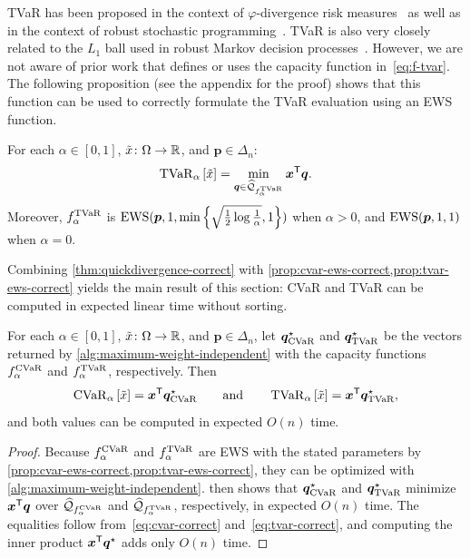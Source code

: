 TVaR has been proposed in the context of $\varphi$-divergence risk measures~\cite{Kruse2021} as well as in the context of robust stochastic programming~\cite{Shapiro2017}. TVaR is also very closely related to the $L_1$ ball used in robust Markov decision processes~\cite{Ho2021,Ho2022}. However, we are not aware of prior work that defines or uses the capacity function in~\eqref{eq:f-tvar}. The following proposition (see the appendix for the proof) shows that this function can be used to correctly formulate the TVaR evaluation using an EWS function. 
\begin{proposition} \label{prop:tvar-ews-correct}
For each $\alpha\in [0,1]$, $\tilde{x} \colon \Omega \to \mathbb{R}$, and $\bm{p} \in \Delta_n$: 
\begin{equation} \label{eq:tvar-correct}
  \operatorname{TVaR}_{\alpha} \left[\tilde{x} \right] = \min_{\bm{q}\in \widehat{\mathcal{Q}}_{f_{\alpha}^{\operatorname{TVaR}}}} \bm{x}^{\mathsf{T}} \bm{q}.
\end{equation}
Moreover, $f^{\operatorname{TVaR}}_{\alpha }$ is $\operatorname{EWS}(\bm{p}, 1, \min \left\{   \sqrt{\frac{1}{2}  \log \frac{1}{\alpha}}, 1 \right\})$  when $\alpha > 0$, and $\operatorname{EWS}(\bm{p}, 1, 1)$ when $\alpha = 0$.
\end{proposition}

Combining \cref{thm:quickdivergence-correct} with \cref{prop:cvar-ews-correct,prop:tvar-ews-correct} yields the main result of this section: CVaR and TVaR can be computed in expected linear time without sorting.
\begin{corollary} \label{cor:cvar-tvar-linear}
For each $\alpha\in [0,1]$, $\tilde{x} \colon \Omega \to \mathbb{R}$, and $\bm{p} \in \Delta_n$, let $\bm{q}^{\star}_{\operatorname{CVaR}}$ and $\bm{q}^{\star}_{\operatorname{TVaR}}$ be the vectors returned by \cref{alg:maximum-weight-independent} with the capacity functions $f^{\operatorname{CVaR}}_{\alpha}$ and $f^{\operatorname{TVaR}}_{\alpha}$, respectively. Then
\[
  \operatorname{CVaR}_{\alpha} \left[\tilde{x}\right] = \bm{x}^{\mathsf{T}} \bm{q}^{\star}_{\operatorname{CVaR}}
  \qquad \text{and} \qquad
  \operatorname{TVaR}_{\alpha} \left[\tilde{x}\right] = \bm{x}^{\mathsf{T}} \bm{q}^{\star}_{\operatorname{TVaR}},
\]
and both values can be computed in expected $O(n)$ time.
\end{corollary}
\begin{proof}
Because $f^{\operatorname{CVaR}}_{\alpha}$ and $f^{\operatorname{TVaR}}_{\alpha}$ are EWS with the stated parameters by \cref{prop:cvar-ews-correct,prop:tvar-ews-correct}, they can be optimized with \cref{alg:maximum-weight-independent}.  then shows that $\bm{q}^{\star}_{\operatorname{CVaR}}$ and $\bm{q}^{\star}_{\operatorname{TVaR}}$ minimize $\bm{x}^{\mathsf{T}}\bm{q}$ over $\widehat{\mathcal{Q}}_{f^{\operatorname{CVaR}}_{\alpha}}$ and $\widehat{\mathcal{Q}}_{f^{\operatorname{TVaR}}_{\alpha}}$, respectively, in expected $O(n)$ time. The equalities follow from~\eqref{eq:cvar-correct} and~\eqref{eq:tvar-correct}, and computing the inner product $\bm{x}^{\mathsf{T}}\bm{q}^{\star}$ adds only $O(n)$ time.
\end{proof}

